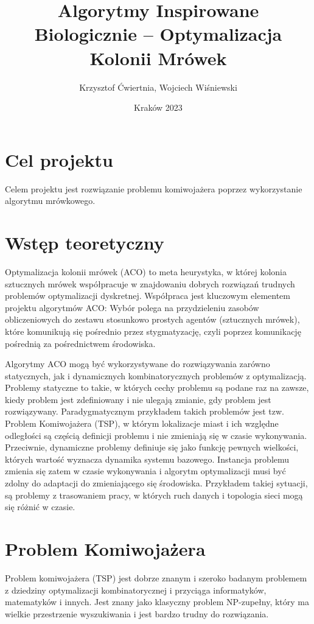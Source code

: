 \documentclass{article}
\title{Algorytmy Inspirowane Biologicznie – Optymalizacja Kolonii Mrówek}
\date{Kraków 2023}
\author{Krzysztof Ćwiertnia, Wojciech Wiśniewski}
\begin{document}
\maketitle

\section{Cel projektu}
Celem projektu jest rozwiązanie problemu komiwojażera poprzez wykorzystanie
algorytmu mrówkowego.

\section{Wstęp teoretyczny}
Optymalizacja kolonii mrówek (ACO) to meta heurystyka, w której kolonia
sztucznych mrówek współpracuje w znajdowaniu dobrych rozwiązań trudnych
problemów optymalizacji dyskretnej. Współpraca jest kluczowym elementem projektu
algorytmów ACO: Wybór polega na przydzieleniu zasobów obliczeniowych do zestawu
stosunkowo prostych agentów (sztucznych mrówek), które komunikują się pośrednio
przez stygmatyzację, czyli poprzez komunikację pośrednią za pośrednictwem
środowiska.

Algorytmy ACO mogą być wykorzystywane do rozwiązywania zarówno statycznych, jak
i dynamicznych kombinatorycznych problemów z optymalizacją. Problemy statyczne
to takie, w których cechy problemu są podane raz na zawsze, kiedy problem jest
zdefiniowany i nie ulegają zmianie, gdy problem jest rozwiązywany.
Paradygmatycznym przykładem takich problemów jest tzw. Problem Komiwojażera
(TSP), w którym lokalizacje miast i ich względne odległości są częścią definicji
problemu i nie zmieniają się w czasie wykonywania. Przeciwnie, dynamiczne
problemy definiuje się jako funkcję pewnych wielkości, których wartość wyznacza
dynamika systemu bazowego. Instancja problemu zmienia się zatem w czasie
wykonywania i algorytm optymalizacji musi być zdolny do adaptacji do
zmieniającego się środowiska. Przykładem takiej sytuacji, są problemy z
trasowaniem pracy, w których ruch danych i topologia sieci mogą się różnić w
czasie.\cite{MIT}

\section{Problem Komiwojażera}
Problem komiwojażera (TSP) jest dobrze znanym i szeroko badanym problemem z
dziedziny optymalizacji kombinatorycznej i przyciąga informatyków, matematyków i
innych. Jest znany jako klasyczny problem NP-zupełny, który ma wielkie
przestrzenie wyszukiwania i jest bardzo trudny do rozwiązania.
\end{document}

